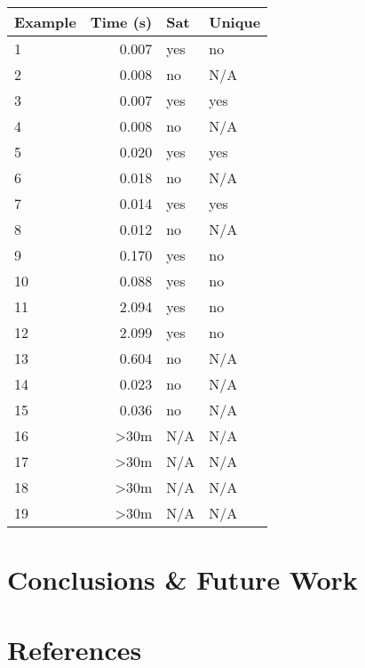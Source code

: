 \documentclass[11pt]{article}
\begin{document}
		\begin{table}[htb]
			\begin{tabular}{|l|l|l|l|}
			\hline
			\textbf{Example} & \textbf{Time (s)}          & \textbf{Sat} & \textbf{Unique} \\ \hline
			1                & \multicolumn{1}{r|}{0.007} & yes          & no              \\
			2				 & \multicolumn{1}{r|}{0.008} & no           & N/A             \\
			3				 & \multicolumn{1}{r|}{0.007} & yes          & yes             \\
			4				 & \multicolumn{1}{r|}{0.008} & no           & N/A             \\
			5				 & \multicolumn{1}{r|}{0.020} & yes          & yes             \\
			6				 & \multicolumn{1}{r|}{0.018} & no           & N/A             \\
			7				 & \multicolumn{1}{r|}{0.014} & yes          & yes             \\
			8				 & \multicolumn{1}{r|}{0.012} & no           & N/A             \\
			9				 & \multicolumn{1}{r|}{0.170} & yes          & no              \\
			10				 & \multicolumn{1}{r|}{0.088} & yes          & no              \\
			11				 & \multicolumn{1}{r|}{2.094} & yes          & no              \\
			12				 & \multicolumn{1}{r|}{2.099} & yes          & no              \\
			13				 & \multicolumn{1}{r|}{0.604} & no           & N/A             \\
			14				 & \multicolumn{1}{r|}{0.023} & no           & N/A             \\
			15				 & \multicolumn{1}{r|}{0.036} & no           & N/A             \\
			16				 & \multicolumn{1}{r|}{\textgreater{}30m} & N/A  & N/A         \\
			17				 & \multicolumn{1}{r|}{\textgreater{}30m} & N/A  & N/A         \\
			18				 & \multicolumn{1}{r|}{\textgreater{}30m} & N/A  & N/A         \\
			19				 & \multicolumn{1}{r|}{\textgreater{}30m} & N/A  & N/A         \\
			\end{tabular}
		\end{table}

	\section{Conclusions \& Future Work}



	\section{References}
	
	
\end{document}
